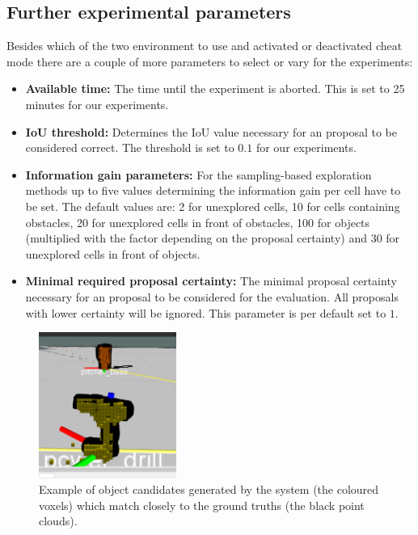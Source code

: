 \documentclass[a4paper,11pt,english]{article}
\begin{document}
\subsection{Further experimental parameters}
Besides which of the two environment to use and activated or deactivated cheat mode there are a couple of more parameters to select or vary for the experiments:

\begin{itemize}
	\item \textbf{Available time:} The time until the experiment is aborted. This is set to 25 minutes for our experiments.
	\item \textbf{IoU threshold:} Determines the IoU value necessary for an proposal to be considered correct. The threshold is set to $0.1$ for our experiments.
	\item \textbf{Information gain parameters:} For the sampling-based exploration methods up to five values determining the information gain per cell have to be set. The default values are: 2 for unexplored cells, 10 for cells containing obstacles, 20 for unexplored cells in front of obstacles, 100 for objects (multiplied with the factor depending on the proposal certainty) and 30 for unexplored cells in front of objects.
	\item \textbf{Minimal required proposal certainty:} The minimal proposal certainty necessary for an proposal to be considered for the evaluation. All proposals with lower certainty will be ignored. This parameter is per default set to $1$.
\end{itemize}

\begin{figure}[h]
	\begin{center}
		\includegraphics[width=0.4\textwidth]{src/drill2.png}
		\caption{Example of object candidates generated by the system (the coloured voxels) which match closely to the ground truths (the black point clouds).}
		\label{fig:good_results}
	\end{center}
\end{figure}
\end{document}
